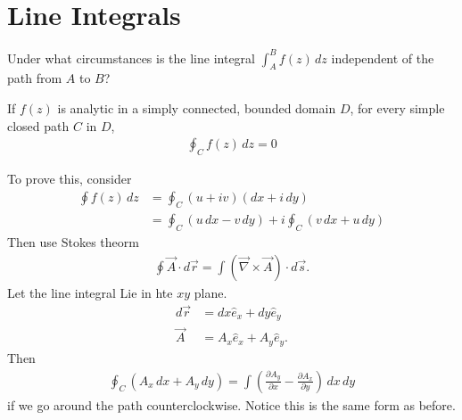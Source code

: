 \section{Line Integrals}
Under what circumstances is the line integral
$\int_{A}^{B} f(z) \, dz$
independent of the path from $A$ to $B$?

\begin{theorem}[Cauchy]
    If $f(z)$ is analytic in a simply connected,
    bounded domain $D$,
    for every simple closed path $C$ in $D$,
    \begin{align}
        \oint_C f(z) \, dz = 0
        \label{eqn:1}
    \end{align}
\end{theorem}
To prove this, consider
\begin{align}
    \oint f(z)\, dz
    &= \oint_C (u + iv) (dx + i\, dy)\\
    &= \oint_C (u\,dx - v\,dy) +
    i \oint_C (v\,dx + u\,dy)
\end{align}
Then use Stokes theorm
\begin{align}
    \oint\vec{A}\cdot d\vec{r}
    = \int(\vec{\nabla}\times\vec{A})\cdot d\vec{s}.
\end{align}
Let the line integral Lie in hte $xy$ plane.
\begin{align}
    d\vec{r}
    &= dx \hat{e}_x + dy\hat{e}_y\\
    \vec{A} &= A_x \hat{e}_x + A_y \hat{e}_y.
\end{align}
Then
\begin{align}
    \oint_C \left(
        A_x\,dx + A_y\,dy
    \right)
    = \int\left(
    \frac{\partial A_y}{\partial x}
    - \frac{\partial A_x}{\partial y}
    \right)\,dx\,dy
\end{align}
if we go around the path counterclockwise.
Notice this is the same form as before.

